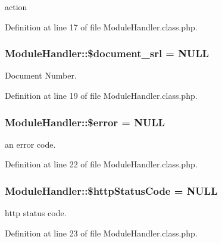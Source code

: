 action 



Definition at line 17 of file Module\+Handler.\+class.\+php.

\subsubsection[{\texorpdfstring{\$document\+\_\+srl}{$document_srl}}]{\setlength{\rightskip}{0pt plus 5cm}Module\+Handler\+::\$document\+\_\+srl = N\+U\+LL}\hypertarget{classModuleHandler_acf9f6062042025aab6a7e10f6b261909}{}\label{classModuleHandler_acf9f6062042025aab6a7e10f6b261909}


Document Number. 



Definition at line 19 of file Module\+Handler.\+class.\+php.

\subsubsection[{\texorpdfstring{\$error}{$error}}]{\setlength{\rightskip}{0pt plus 5cm}Module\+Handler\+::\$error = N\+U\+LL}\hypertarget{classModuleHandler_ad81b78f21e42724e73da6808c561159c}{}\label{classModuleHandler_ad81b78f21e42724e73da6808c561159c}


an error code. 



Definition at line 22 of file Module\+Handler.\+class.\+php.

\subsubsection[{\texorpdfstring{\$http\+Status\+Code}{$httpStatusCode}}]{\setlength{\rightskip}{0pt plus 5cm}Module\+Handler\+::\$http\+Status\+Code = N\+U\+LL}\hypertarget{classModuleHandler_a033e864206ca6a6494af015baa5d2365}{}\label{classModuleHandler_a033e864206ca6a6494af015baa5d2365}


http status code. 



Definition at line 23 of file Module\+Handler.\+class.\+php.

